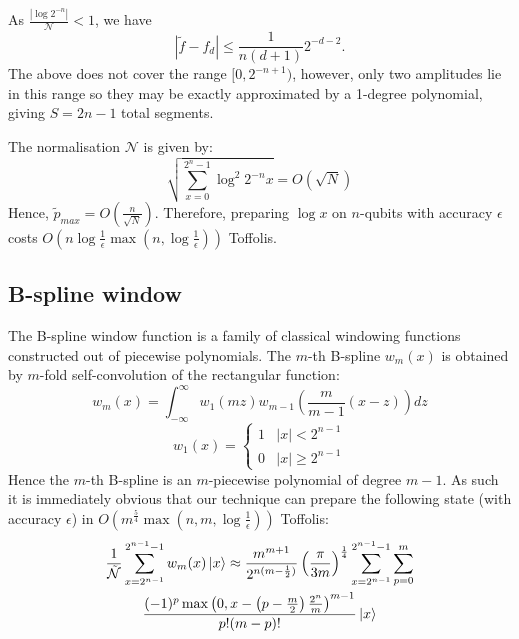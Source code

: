 \documentclass[a4paper,twocolumn,,accepted=2025-05-27]{quantumarticle}
\theoremstyle{empty}
\begin{document}
As $\frac{|\log 2^{-n}|}{\mathcal{N}} < 1$, we have
\begin{equation}
    |\tilde f - f_{d}| \leq  \frac{1}{n(d+1)} 2^{-d-2}.
\end{equation}
The above does not cover the range $[0, 2^{-n+1})$, however, only two amplitudes lie in this range so they may be exactly approximated by a 1-degree polynomial, giving $S=2n-1$ total segments.

The normalisation $\mathcal{N}$ is given by:
\begin{equation}
    \sqrt{\sum_{x=0}^{2^n-1}\log^2 2^{-n} x} = O\left(\sqrt{N}\right)
\end{equation}
Hence, $\tilde{p}_{max} = O\left(\frac{n}{\sqrt{N}}\right)$. Therefore, preparing $\log{x}$ on $n$-qubits with accuracy $\epsilon$ costs $O(n \log \frac{1}{\epsilon}\max(n, \log\frac{1}{\epsilon}))$ Toffolis. 

\subsection{B-spline window}
\label{section:b_spline}
  The B-spline window function \cite{bspline} is a family of classical windowing functions constructed out of piecewise polynomials. The $m$-th B-spline $w_m(x)$ is obtained by $m$-fold self-convolution of the rectangular function:
  \begin{equation}
  \label{eq:self_conv}
      w_m(x) = \int_{-\infty}^{\infty} w_1(m z) w_{m-1}\left(\frac{m}{m-1}(x-z)\right) dz
  \end{equation}
  \begin{equation}
      w_1(x) = \begin{cases}
          1 & |x| < 2^{n-1}\\
          0 & |x| \geq 2^{n-1}
      \end{cases}
  \end{equation}
  Hence the $m$-th B-spline is an $m$-piecewise polynomial of degree $m-1$. As such it is immediately obvious that our technique can prepare the following state (with accuracy $\epsilon$) in $O(m^{\frac{5}{4}}\max(n,m, \log \frac{1}{\epsilon}))$ Toffolis:
  \begin{multline}
      \frac{1}{\mathcal{\tilde N}}\sum_{x=2^{n-1}}^{2^{n-1} -1} w_m(x)\ket{x} \approx \frac{m^{m+1}}{2^{n(m-\frac{1}{2})}}\left(\frac{\pi}{3m}\right)^{\frac{1}{4}}\sum_{x=2^{n-1}}^{2^{n -1}-1}\sum_{p=0}^m\\   \frac{(-1)^p \max\left(0,x - \left(p-\frac{m}{2}\right)\frac{2^n}{m}\right)^{m-1}}{p!(m-p)!}\ket{x}
  \end{multline}
  
\end{document}
